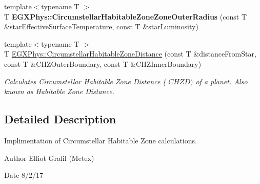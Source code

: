 \begin{DoxyCompactItemize}
\item 
\mbox{\label{namespace_e_g_x_phys_ac6f89712c52ce26e1e2085fd85a914ea}} 
{\footnotesize template$<$typename T $>$ }\\T {\bfseries E\+G\+X\+Phys\+::\+Circumstellar\+Habitable\+Zone\+Zone\+Outer\+Radius} (const T \&star\+Effective\+Surface\+Temperature, const T \&star\+Luminosity)
\item 
{\footnotesize template$<$typename T $>$ }\\T \hyperlink{group___astrophysics_gacf3a720793cdb27f6d93b170b44e81be}{E\+G\+X\+Phys\+::\+Circumstellar\+Habitable\+Zone\+Distance} (const T \&distance\+From\+Star, const T \&C\+H\+Z\+Outer\+Boundary, const T \&C\+H\+Z\+Inner\+Boundary)
\begin{DoxyCompactList}\small\item\em Calculates Circumstellar Habitable Zone Distance ( $CHZD)$ of a planet. Also known as Habitable Zone Distance. \end{DoxyCompactList}\end{DoxyCompactItemize}


\subsection{Detailed Description}
Implimentation of Circumstellar Habitable Zone calculations. 

\begin{DoxyAuthor}{Author}
Elliot Grafil (Metex) 
\end{DoxyAuthor}
\begin{DoxyDate}{Date}
8/2/17 
\end{DoxyDate}
